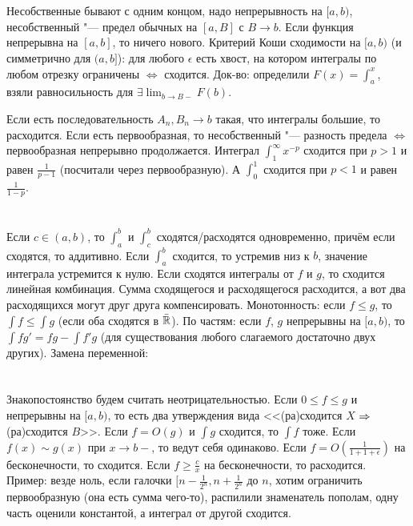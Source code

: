\section{} %
Несобственные бывают с одним концом, надо непрерывность на $[a, b)$, несобственный "--- предел обычных на $[a, B]$ с $B \to b$.
Если функция непрерывна на $[a, b]$, то ничего нового.
Критерий Коши сходимости на $[a, b)$ (и симметрично для $(a, b]$): для любого $\epsilon$ есть хвост, на котором интегралы по любом отрезку ограничены $\iff$ сходится.
Док-во: определили $F(x)=\int_a^x$, взяли равносильность для $\exists \lim_{b\to B-} F(b)$.

Если есть последовательность $A_n, B_n \to b$ такая, что интегралы большие, то расходится.
Если есть первообразная, то несобственный "--- разность предела $\iff$ первообразная непрерывно продолжается.
Интеграл $\int_1^\infty x^{-p}$ сходится при $p>1$ и равен $\frac{1}{p-1}$ (посчитали через первообразную).
А $\int_0^1$ сходится при $p<1$ и равен $\frac1{1-p}$.

\section{} %
Если $c \in (a,b)$, то $\int_a^b$ и $\int_c^b$ сходятся/расходятся одновременно, причём если сходятся, то аддитивно.
Если $\int_a^b$ сходится, то устремив низ к $b$, значение интеграла устремится к нулю.
Если сходятся интегралы от $f$ и $g$, то сходится линейная комбинация.
Сумма сходящегося и расходящегося расходится, а вот два расходящихся могут друг друга компенсировать.
Монотонность: если $f \le g$, то $\int f \le \int g$ (если оба сходятся в $\bar {\mathbb{R}}$).
По частям: если $f$, $g$ непрерывны на $[a, b)$, то $\int fg' = fg - \int f'g$ (для существования любого слагаемого достаточно двух других).
Замена переменной: \TODO %

\section{} %
Знакопостоянство будем считать неотрицательностью.
Если $0 \le f \le g$ и непрерывны на $[a, b)$, то есть два утверждения вида <<(ра)сходится $X$ $\Rightarrow$ (ра)сходится $B$>>.
Если $f=O(g)$ и $\int g$ сходится, то $\int f$ тоже.
Если $f(x) \sim g(x)$ при $x\to b-$, то ведут себя одинаково.
Если $f=O(\frac{1}{1+{1+\epsilon}})$ на бесконечности, то сходится.
Если $f\ge \frac cx$ на бесконечности, то расходится.
Пример: везде ноль, если галочки $[n-\frac1{2^n}, n+\frac1{2^n}$ до $n$, хотим ограничить первообразную (она есть сумма чего-то),
распилили знаменатель пополам, одну часть оценили константой, а интеграл от другой сходится.

